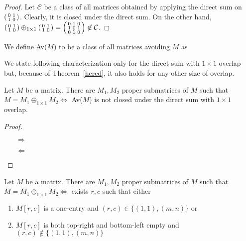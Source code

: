 \begin{proof}
Let $\mathcal{C}$ be a class of all matrices obtained by applying the direct sum on $\left(\begin{smallmatrix}0&1\\1&0\end{smallmatrix}\right)$. Clearly, it is closed under the direct sum. On the other hand, $\left(\begin{smallmatrix}0&1\\1&0\end{smallmatrix}\right)\oplus_{1\times1}\left(\begin{smallmatrix}0&1\\1&0\end{smallmatrix}\right)=\left(\begin{smallmatrix}0&1&0\\1&0&1\\0&1&0\end{smallmatrix}\right)\not\in\mathcal{C}$.
\end{proof}
\begin{ntn}
We define Av($M$) to be a class of all matrices avoiding $M$ as 
\end{ntn}
We state following characterization only for the direct sum with $1\times1$ overlap but, because of Theorem~\ref{hered}, it also holds for any other size of overlap.
\begin{thm}
Let $M$ be a matrix. There are $M_1,M_2$ proper submatrices of $M$ such that $M=M_1\oplus_{1\times1}M_2\Leftrightarrow$ Av($M$) is not closed under the direct sum with $1\times1$ overlap.
\end{thm}
\begin{proof}
\begin{itemize}
\item[$\Rightarrow$]
\item[$\Leftarrow$]
\end{itemize}
\end{proof}
\begin{obs}
Let $M$ be a matrix. There are $M_1,M_2$ proper submatrices of $M$ such that $M=M_1\oplus_{1\times1}M_2\Leftrightarrow$ exists $r,c$ such that either
\begin{enumerate}
\item $M[r,c]$ is a one-entry and $(r,c)\in\{(1,1),(m,n)\}$ or
\item $M[r,c]$ is both top-right and bottom-left empty and $(r,c)\not\in\{(1,1),(m,n)\}$
\end{enumerate}
\end{obs}